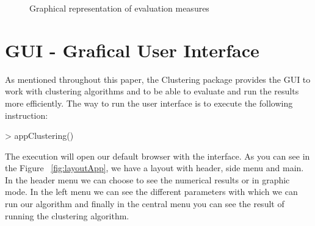 \begin{figure}[htbp]
  \centering
    \qquad
    \caption{Graphical representation of evaluation measures}%
    \label{fig:clustering}%
\end{figure}

\section{GUI - Grafical User Interface}

As mentioned throughout this paper, the Clustering package provides the GUI to work with clustering algorithms and to be able to evaluate and run the results more efficiently. The way to run the user interface is to execute the following instruction:

\begin{Schunk}
\begin{Sinput}
> appClustering()
\end{Sinput}
\end{Schunk}

The execution will open our default browser with the interface. As you can see in the Figure ~\ref{fig:layoutApp}, we have a layout with header, side menu and main. In the header menu we can choose to see the numerical results or in graphic mode. In the left menu we can see the different parameters with which we can run our algorithm and finally in the central menu you can see the result of running the clustering algorithm.


